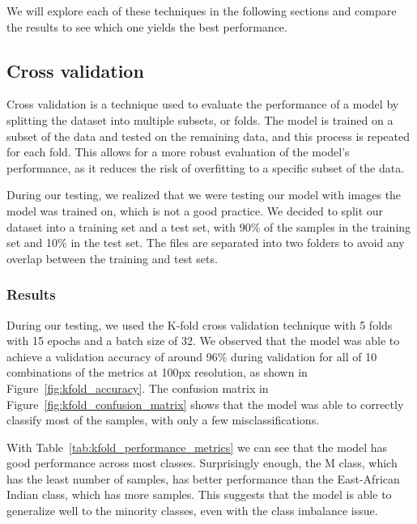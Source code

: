 We will explore each of these techniques in the following sections and compare the results to see which one yields the best performance.

\subsection{Cross validation}
\label{subsec:cross_validation}

Cross validation is a technique used to evaluate the performance of a model by splitting the dataset into multiple subsets, or folds.
The model is trained on a subset of the data and tested on the remaining data, and this process is repeated for each fold.
This allows for a more robust evaluation of the model's performance, as it reduces the risk of overfitting to a specific subset of the data.

\label{subsubsec:remaking_dataset}

During our testing, we realized that we were testing our model with images the model was trained on, which is not a good practice. We decided to
split our dataset into a training set and a test set, with 90\% of the samples in the training set and 10\% in the test set. The files are separated
into two folders to avoid any overlap between the training and test sets.

\subsubsection{Results}
\label{subsec:results_cross_validation}

During our testing, we used the K-fold cross validation technique with 5 folds with 15 epochs and a batch size of 32. We observed that the model
was able to achieve a validation accuracy of around 96\% during validation for all of 10 combinations of the metrics at 100px resolution, as shown in
Figure~\ref{fig:kfold_accuracy}. The confusion matrix in Figure~\ref{fig:kfold_confusion_matrix} shows that the model was able to correctly classify
most of the samples, with only a few misclassifications.

With Table~\ref{tab:kfold_performance_metrics} we can see that the model has good performance across most classes. Surprisingly enough, the M class,
which has the least number of samples, has better performance than the East-African Indian class, which has more samples. This suggests that the model
is able to generalize well to the minority classes, even with the class imbalance issue.

